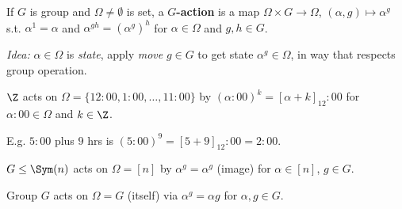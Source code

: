 \begin{slide}
    \begin{definition}
        \vspace{0pt}
        If $G$ is group and $\Omega \neq \emptyset$ is set, a \textbf{$G$-action} is a map $\Omega \times G \to \Omega$, $(\alpha,g) \mapsto \alpha^g$ s.t. $\alpha^1 = \alpha$ and $\alpha^{gh} = (\alpha^g)^h$ for $\alpha \in \Omega$ and $g,h \in G$.
    \end{definition}

    \textit{Idea:} $\alpha \in \Omega$ is \textit{state}, apply \textit{move} $g \in G$ to get state $\alpha^g \in \Omega$, in way that respects group operation. \pause

    \begin{example}
        \vspace{0pt}
        $\Z$ acts on $\Omega = \{12{:}00,1{:}00,\dotsc,11{:}00\}$ by $(\alpha{:}00)^k = [\alpha + k]_{12}{:}00$ for $\alpha{:}00 \in \Omega$ and $k \in \Z$. \pause

        E.g. $5{:}00$ plus $9$ hrs is $(5{:}00)^9 = [5+9]_{12}{:}00 = 2{:}00$.
    \end{example} \pause

    \begin{example}
        \vspace{0pt}
        $G \leq \Sym(n)$ acts on $\Omega = [n]$ by $\alpha^g = \alpha^g$ (image) for $\alpha \in [n]$, $g \in G$.
    \end{example} \pause

    \begin{example}
        \vspace{0pt}
        Group $G$ acts on $\Omega = G$ (itself) via $\alpha^g = \alpha g$ for $\alpha,g \in G$.
    \end{example}
\end{slide}

